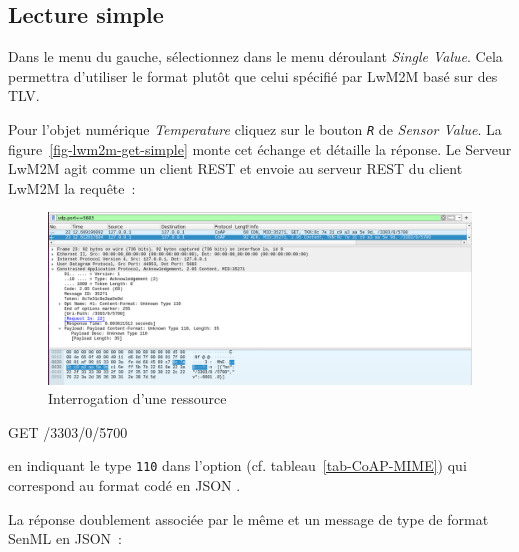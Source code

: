 \subsection{Lecture simple}

Dans le menu du gauche, sélectionnez  dans le menu déroulant \textit{Single Value}. Cela permettra d'utiliser le format  plutôt que celui spécifié par LwM2M basé sur des \ac{TLV}. 

         \vspace{1em}

Pour l'objet numérique \textit{Temperature} cliquez sur le bouton \texttt{\textit{R}} de \textit{Sensor Value}. La figure~\vref{fig-lwm2m-get-simple} monte cet échange et détaille la réponse.
Le Serveur LwM2M agit comme un client REST et envoie au serveur REST du client LwM2M la requête~:

\begin{figure}[tbp]
\centerline{\includegraphics[width=1\columnwidth]{Pictures/lwm2m-get-simple.png}}
\caption{Interrogation d'une ressource}
\label{fig-lwm2m-get-simple}
\end{figure}

\begin{termc}[backgroundcolor=\color{orange!40}, basicstyle=\ttfamily\small, escapechar=@] %
GET /3303/0/5700 
\end{termc}

\noindent en indiquant le type \texttt{110} dans l'option  (cf. tableau~\vref{tab-CoAP-MIME}) qui correspond au format  codé en JSON . 


         \vspace{1em}


La réponse doublement associée par le même  et un message de type  de format SenML en JSON~:  


\begin{termc}[backgroundcolor=\color{purple!30}, basicstyle=\ttfamily\small, escapechar=@] %
[{"bn":"/3303/0/5700","v":-6601.8}]
\end{termc}

